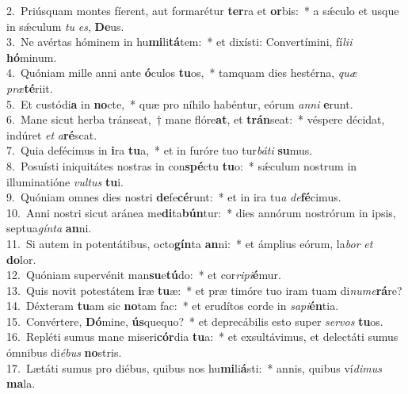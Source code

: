 {2.~}Priúsquam montes fíerent, aut formarétur \textbf{ter}ra et \textbf{or}bis:~* a sǽculo et usque in sǽculum \textit{tu} \textit{es}, \textbf{De}us.\\
{3.~}Ne avértas hóminem in hu\textbf{mi}li\textbf{tá}tem:~* et dixísti: Convertímini, fí\textit{li}\textit{i} \textbf{hó}minum.\\
{4.~}Quóniam mille anni ante \textbf{ó}culos \textbf{tu}os,~* tamquam dies hestérna, \textit{quæ} \textit{præ}\textbf{té}riit.\\
{5.~}Et custódi\textbf{a} in \textbf{no}cte,~* quæ pro níhilo habéntur, eórum \textit{an}\textit{ni} \textbf{e}runt.\\
{6.~}Mane sicut herba tránseat,~† mane flóre\textbf{at}, et \textbf{trán}seat:~* véspere décidat, indúret \textit{et} \textit{a}\textbf{ré}scat.\\
{7.~}Quia defécimus in \textbf{i}ra \textbf{tu}a,~* et in furóre tuo tur\textit{bá}\textit{ti} \textbf{su}mus.\\
{8.~}Posuísti iniquitátes nostras in con\textbf{spé}ctu \textbf{tu}o:~* sǽculum nostrum in illuminatióne \textit{vul}\textit{tus} \textbf{tu}i.\\
{9.~}Quóniam omnes dies nostri \textbf{de}fe\textbf{cé}runt:~* et in ira tu\textit{a} \textit{de}\textbf{fé}cimus.\\
{10.~}Anni nostri sicut aránea me\textbf{di}ta\textbf{bún}tur:~* dies annórum nostrórum in ipsis, septua\textit{gín}\textit{ta} \textbf{an}ni.\\
{11.~}Si autem in potentátibus, octo\textbf{gín}ta \textbf{an}ni:~* et ámplius eórum, la\textit{bor} \textit{et} \textbf{do}lor.\\
{12.~}Quóniam supervénit man\textbf{su}e\textbf{tú}do:~* et cor\textit{ri}\textit{pi}\textbf{é}mur.\\
{13.~}Quis novit potestátem \textbf{i}ræ \textbf{tu}æ:~* et præ timóre tuo iram tuam di\textit{nu}\textit{me}\textbf{rá}re?\\
{14.~}Déxteram \textbf{tu}am sic \textbf{no}tam fac:~* et erudítos corde in \textit{sa}\textit{pi}\textbf{én}tia.\\
{15.~}Convértere, \textbf{Dó}mine, \textbf{ús}quequo?~* et deprecábilis esto super \textit{ser}\textit{vos} \textbf{tu}os.\\
{16.~}Repléti sumus mane miseri\textbf{cór}dia \textbf{tu}a:~* et exsultávimus, et delectáti sumus ómnibus di\textit{é}\textit{bus} \textbf{no}stris.\\
{17.~}Lætáti sumus pro diébus, quibus nos hu\textbf{mi}li\textbf{á}sti:~* annis, quibus ví\textit{di}\textit{mus} \textbf{ma}la.\\
